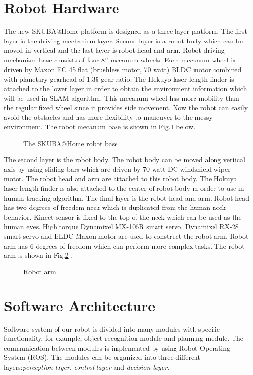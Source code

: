 \documentclass{llncs}
\begin{document}
\section{Robot Hardware}

The new SKUBA@Home platform is designed as a three layer platform. The first layer is the driving mechanism layer. Second layer is a robot body which can be moved in vertical and the last layer is robot head and arm. Robot driving mechanism base consists of four 8'' mecanum wheels. Each mecanum wheel is driven by Maxon EC 45 flat (brushless motor, 70 watt) BLDC motor combined with planetary gearhead of 1:36 gear ratio. The Hokuyo laser length finder is attached to the lower layer in
order to obtain the environment information which will be used
in SLAM algorithm. This mecanum
wheel has more mobility than the regular fixed wheel since it provides side movement. Now the robot can easily avoid the obstacles and has more flexibility to maneuver to the messy environment. The robot mecanum base is shown in Fig.\ref{fig:base} below.

\begin{figure}
\centering
\caption{The SKUBA@Home robot base}
\label{fig:base}
\end{figure}

The second layer is the robot body. The robot body can be moved along vertical axis by using sliding bars which are driven by 70 watt DC windshield wiper motor. The robot head and arm are attached to this robot body. The Hokuyo laser length finder is also attached to the center of robot body in order to use in human tracking algorithm. The final layer is the robot head and arm. Robot head has two degrees of freedom neck which is duplicated from the human neck behavior. Kinect sensor is fixed to the top of the neck which can be used as the human eyes. High torque Dynamixel MX-106R smart servo, Dynamixel RX-28 smart servo and BLDC Maxon motor are used to construct the robot arm. Robot arm has 6 degrees of freedom which can perform more complex tasks. The robot arm is shown in Fig.\ref{fig:arm} .

\begin{figure}
\centering
\caption{Robot arm}
\label{fig:arm}
\end{figure}

\section{Software Architecture}
Software system of our robot is divided into many modules with specific functionality, for example, object recognition module and planning module. The communication between modules is implemented by using Robot Operating System (ROS). The modules can be organized into three different layers:\textit{perception layer}, \textit{control layer} and \textit{decision layer}.
\end{document}
